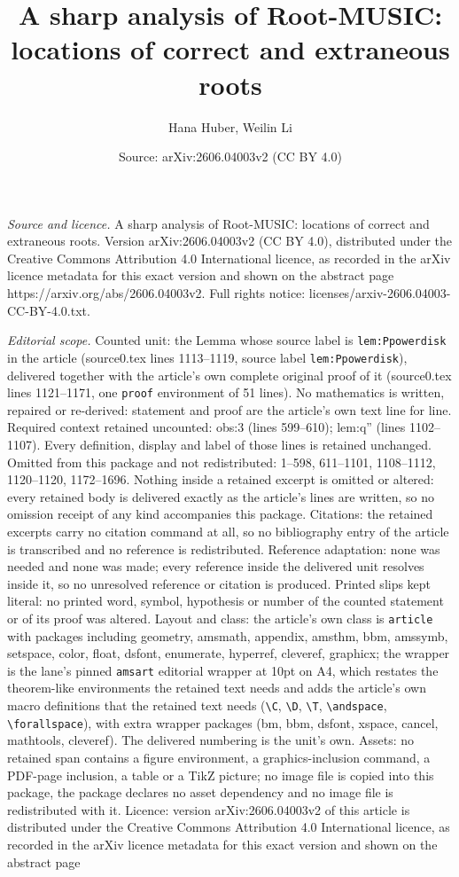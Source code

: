 \documentclass[10pt,a4paper]{amsart}
\title[A sharp analysis of Root-MUSIC: locations of correct and ext]{A sharp analysis of Root-MUSIC: locations of correct and extraneous roots}
\author{Hana Huber, Weilin Li}
\date{Source: arXiv:2606.04003v2 (CC BY 4.0)}
\begin{document}
\maketitle

\noindent\emph{Source and licence.} A sharp analysis of Root-MUSIC: locations of correct and extraneous roots. Version arXiv:2606.04003v2 (CC BY 4.0), distributed under the Creative Commons Attribution 4.0 International licence, as recorded in the arXiv licence metadata for this exact version and shown on the abstract page https://arxiv.org/abs/2606.04003v2. Full rights notice: licenses/arxiv-2606.04003-CC-BY-4.0.txt.\par\smallskip

\noindent\textit{Editorial scope.} Counted unit: the Lemma whose source label is \texttt{lem:Ppowerdisk} in the article (source0.tex lines 1113--1119, source label \texttt{lem:Ppowerdisk}), delivered together with the article's own complete original proof of it (source0.tex lines 1121--1171, one \texttt{proof} environment of 51 lines). No mathematics is written, repaired or re-derived: statement and proof are the article's own text line for line. Required context retained uncounted: obs:3 (lines 599--610); lem:q'' (lines 1102--1107). Every definition, display and label of those lines is retained unchanged. Omitted from this package and not redistributed: 1--598, 611--1101, 1108--1112, 1120--1120, 1172--1696. Nothing inside a retained excerpt is omitted or altered: every retained body is delivered exactly as the article's lines are written, so no omission receipt of any kind accompanies this package. Citations: the retained excerpts carry no citation command at all, so no bibliography entry of the article is transcribed and no reference is redistributed. Reference adaptation: none was needed and none was made; every reference inside the delivered unit resolves inside it, so no unresolved reference or citation is produced. Printed slips kept literal: no printed word, symbol, hypothesis or number of the counted statement or of its proof was altered. Layout and class: the article's own class is \texttt{article} with packages including geometry, amsmath, appendix, amsthm, bbm, amssymb, setspace, color, float, dsfont, enumerate, hyperref, cleveref, graphicx; the wrapper is the lane's pinned \texttt{amsart} editorial wrapper at 10pt on A4, which restates the theorem-like environments the retained text needs and adds the article's own macro definitions that the retained text needs (\texttt{\textbackslash C}, \texttt{\textbackslash D}, \texttt{\textbackslash T}, \texttt{\textbackslash andspace}, \texttt{\textbackslash forallspace}), with extra wrapper packages (bm, bbm, dsfont, xspace, cancel, mathtools, cleveref). The delivered numbering is the unit's own. Assets: no retained span contains a figure environment, a graphics-inclusion command, a PDF-page inclusion, a table or a TikZ picture; no image file is copied into this package, the package declares no asset dependency and no image file is redistributed with it. Licence: version arXiv:2606.04003v2 of this article is distributed under the Creative Commons Attribution 4.0 International licence, as recorded in the arXiv licence metadata for this exact version and shown on the abstract page 
\end{document}
